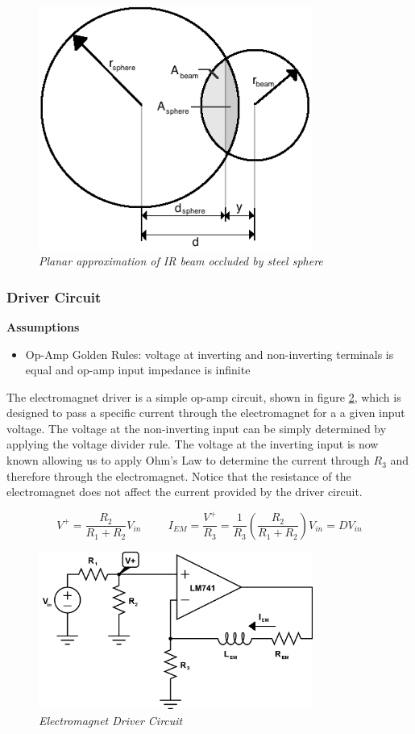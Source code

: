 \documentclass{article}
\theoremstyle{plain}
\theoremstyle{definition}
\theoremstyle{remark}
\begin{document}
\begin{figure}
\begin{center}
\includegraphics[width = 9cm]{beam_sphere_diagram.png}
\caption{\emph{Planar approximation of IR beam occluded by steel sphere}}
\label{Q1_a1}
\end{center}
\end{figure}

\subsubsection*{Driver Circuit}
\textbf{Assumptions}
\begin{itemize}
\item Op-Amp Golden Rules: voltage at inverting and non-inverting terminals is equal and op-amp input impedance is infinite
\end{itemize}

The electromagnet driver is a simple op-amp circuit, shown in figure \ref{Q1_a2}, which is designed to pass a specific current through the electromagnet for a a given input voltage.  The voltage at the non-inverting input can be simply determined by applying the voltage divider rule.  The voltage at the inverting input is now known allowing us to apply Ohm's Law to determine the current through $R_{3}$ and therefore through the electromagnet.  Notice that the resistance of the electromagnet does not affect the current provided by the driver circuit.

$$ V^{+}=\frac{R_2}{R_1+R_2}V_{in} \hspace{1cm} I_{EM}=\frac{V^{+}}{R_3}=\frac{1}{R_3}\left(\frac{R_2}{R_1+R_2}\right)V_{in} = DV_{in}$$

\begin{figure}
\begin{center}
\includegraphics[width = 9cm]{em_driver_circuit.png}
\caption{\emph{Electromagnet Driver Circuit}}
\label{Q1_a2}
\end{center}
\end{figure}
\end{document}
